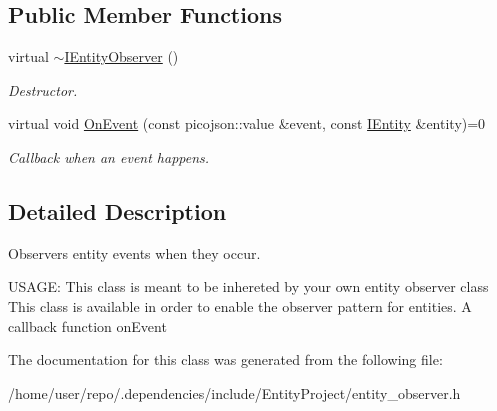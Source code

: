 \subsection*{Public Member Functions}
\begin{DoxyCompactItemize}
\item 
\mbox{\label{classentity__project_1_1IEntityObserver_acafdf6ac59d9522d4d08cdfb52dec8d4}} 
virtual \hyperlink{classentity__project_1_1IEntityObserver_acafdf6ac59d9522d4d08cdfb52dec8d4}{$\sim$\+I\+Entity\+Observer} ()
\begin{DoxyCompactList}\small\item\em Destructor. \end{DoxyCompactList}\item 
\mbox{\label{classentity__project_1_1IEntityObserver_ac346f41c002c1f7cd4aa4ee501146c6c}} 
virtual void \hyperlink{classentity__project_1_1IEntityObserver_ac346f41c002c1f7cd4aa4ee501146c6c}{On\+Event} (const picojson\+::value \&event, const \hyperlink{classentity__project_1_1IEntity}{I\+Entity} \&entity)=0
\begin{DoxyCompactList}\small\item\em Callback when an event happens. \end{DoxyCompactList}\end{DoxyCompactItemize}


\subsection{Detailed Description}
Observers entity events when they occur. 

U\+S\+A\+GE\+: This class is meant to be inhereted by your own entity observer class This class is available in order to enable the observer pattern for entities. A callback function on\+Event 

The documentation for this class was generated from the following file\+:\begin{DoxyCompactItemize}
\item 
/home/user/repo/.\+dependencies/include/\+Entity\+Project/entity\+\_\+observer.\+h\end{DoxyCompactItemize}
